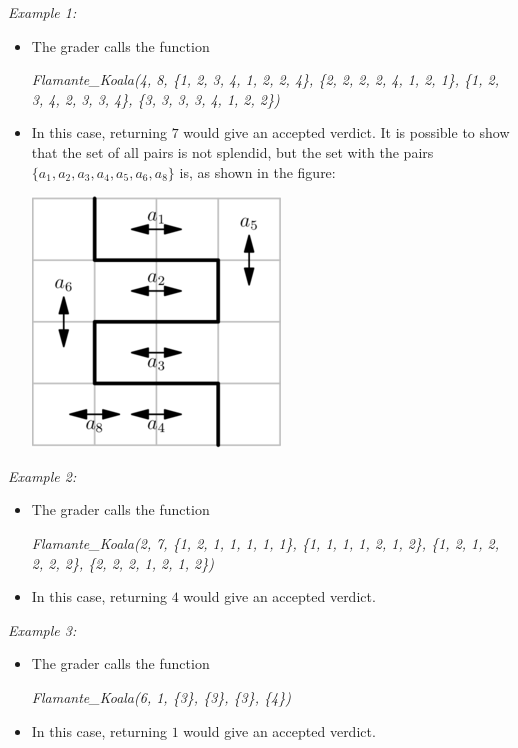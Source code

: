 \documentclass[12pt]{scrartcl}
\begin{document}
        {\itshape Example 1:}
        \begin{itemize}
            \item The grader calls the function 

            \begin{center}
                {\itshape Flamante\_Koala(4, 8, \{1, 2, 3, 4, 1, 2, 2, 4\}, \{2, 2, 2, 2, 4, 1, 2, 1\}, \{1, 2, 3, 4, 2, 3, 3, 4\}, \{3, 3, 3, 3, 4, 1, 2, 2\})}
            \end{center}
            
            \item In this case, returning $7$ would give an accepted verdict. It is possible to show that the set of all pairs is not splendid, but the set with the pairs $\{a_1, a_2, a_3, a_4, a_5, a_6, a_8\}$ is, as shown in the figure:
            \begin{center}
                \includegraphics[scale=4]{ej1.png}
            \end{center}
        \end{itemize}
        
        {\itshape Example 2:}
        \begin{itemize}
            \item The grader calls the function 

            \begin{center}
                {\itshape Flamante\_Koala(2, 7, \{1, 2, 1, 1, 1, 1, 1\}, \{1, 1, 1, 1, 2, 1, 2\}, \{1, 2, 1, 2, 2, 2, 2\}, \{2, 2, 2, 1, 2, 1, 2\})}
            \end{center}
            
            \item In this case, returning $4$ would give an accepted verdict. 
        \end{itemize}
        
        {\itshape Example 3:}
        \begin{itemize}
            \item The grader calls the function 

            \begin{center}
                {\itshape Flamante\_Koala(6, 1, \{3\}, \{3\}, \{3\}, \{4\})}
            \end{center}
            
            \item In this case, returning $1$ would give an accepted verdict. 
        \end{itemize}
        
\end{document}
